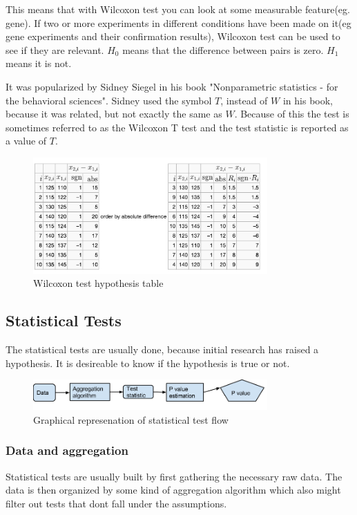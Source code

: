 \documentclass[12pt]{article}
\begin{document}
This means that with Wilcoxon test you can look at some measurable feature(eg. gene). If two or more experiments in different conditions have been made on it(eg gene experiments and their confirmation results), Wilcoxon test can be used to see if they are relevant. $H_0$ means that the difference between pairs is zero. $H_1$ means it is not.

It was popularized by Sidney Siegel in his book "Nonparametric statistics - for the behavioral sciences". Sidney used the symbol $T$, instead of $W$ in his book, because it was related, but not exactly the same as $W$. Because of this the test is sometimes referred to as the Wilcoxon T test and the test statistic is reported as a value of $T$.

\begin{figure}[!h]
  \centering
  \includegraphics[width=0.8\textwidth]{wilcoxon_test_intro}
  \caption{Wilcoxon test hypothesis table}
  \label{fig:wilcoxon_test_intro}
\end{figure}

\subsection{Statistical Tests}

The statistical tests are usually done, because initial research has raised a hypothesis. It is desireable to know if the hypothesis is true or not.

\begin{figure}[!h]
  \centering
  \includegraphics[width=0.8\textwidth]{statisticalTestFlow}
  \caption{Graphical represenation of statistical test flow}
  \label{fig:statisticalTestFlow}
\end{figure}

\subsubsection{Data and aggregation}
Statistical tests are usually built by first gathering the necessary raw data. The data is then organized by some kind of aggregation algorithm which also might filter out tests that dont fall under the assumptions.
\end{document}
